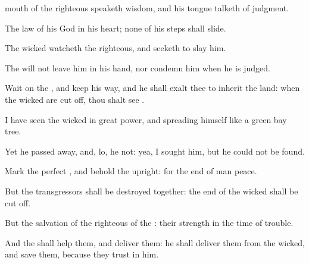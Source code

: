 {mouth of the
righteous
speaketh
wisdom, and his
tongue
talketh of
judgment.
\par }{\Q {}The
law of his
God
{} in his
heart; none of his
steps shall
slide.
\par }{\Q {}The
wicked
watcheth the
righteous, and
seeketh to
slay him.
\par }{\Q {}The
{} will not
leave him in his
hand, nor
condemn him when he is
judged.
\par }{\BB \par }{\Q {}Wait on the
{}, and
keep his
way, and he shall
exalt thee to
inherit the
land: when the
wicked are cut
off, thou shalt
see
{}.
\par }{\Q {}I have
seen the
wicked in great
power, and
spreading himself like a
green bay
tree.
\par }{\Q {}Yet he passed
away, and, lo, he
{} not: yea, I
sought him, but he could not be
found.
\par }{\Q {}Mark the
perfect
{}, and
behold the
upright: for the
end of
{}
man
{}
peace.
\par }{\Q {}But the
transgressors shall be
destroyed
together: the
end of the
wicked shall be cut
off.
\par }{\Q {}But the
salvation of the
righteous
{} of the
{}:
{} their
strength in the
time of
trouble.
\par }{\Q {}And the
{} shall
help them, and
deliver them: he shall
deliver them from the
wicked, and
save them, because they
trust in him.

}

